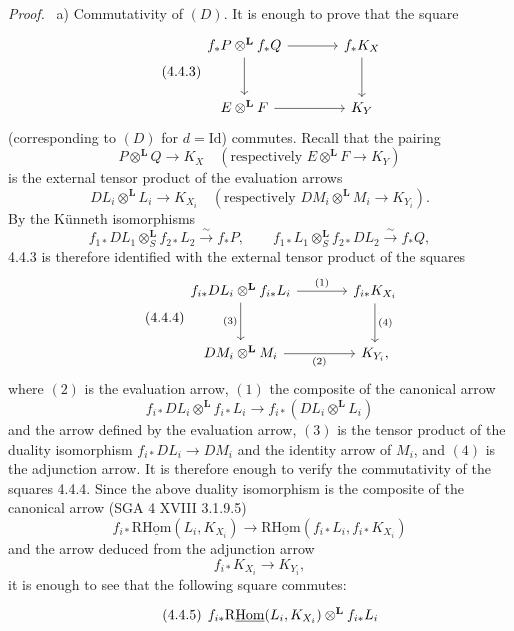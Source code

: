 \documentclass[11pt]{article}
\newenvironment{prooftext}[1][Proof]{\par\noindent\emph{#1.}\ }{\par\medskip}
\providecommand{\Id}{\mathrm{Id}}
\providecommand{\lisom}{\xrightarrow{\sim}}
\begin{document}
\begin{prooftext}[Proof]
a) Commutativity of $(D)$. It is enough to prove that the square
\begin{equation}
\tag{4.4.3}
\begin{tikzcd}[column sep=large,row sep=large]
f_*P\otimes^{\mathbf L}f_*Q \arrow[r] \arrow[d] & f_*K_X \arrow[d]\\
E\otimes^{\mathbf L}F \arrow[r] & K_Y
\end{tikzcd}
\end{equation}
(corresponding to $(D)$ for $d=\Id$) commutes. Recall that the pairing
\[
P\otimes^{\mathbf L}Q\longrightarrow K_X
\quad(\text{respectively }E\otimes^{\mathbf L}F\longrightarrow K_Y)
\]
is the external tensor product of the evaluation arrows
\[
DL_i\otimes^{\mathbf L}L_i\longrightarrow K_{X_i}
\quad(\text{respectively }DM_i\otimes^{\mathbf L}M_i\longrightarrow K_{Y_i}).
\]
By the Künneth isomorphisms
\[
f_{1*}DL_1\otimes_S^{\mathbf L} f_{2*}L_2 \lisom f_*P,\qquad
f_{1*}L_1\otimes_S^{\mathbf L} f_{2*}DL_2 \lisom f_*Q,
\]
4.4.3 is therefore identified with the external tensor product of the squares
\begin{equation}
\tag{4.4.4}
\begin{tikzcd}[column sep=large,row sep=large]
f_{i*}DL_i\otimes^{\mathbf L} f_{i*}L_i
 \arrow[r,"(1)"] \arrow[d,"(3)"'] &
f_{i*}K_{X_i} \arrow[d,"(4)"]\\
DM_i\otimes^{\mathbf L}M_i \arrow[r,"(2)"'] & K_{Y_i},
\end{tikzcd}
\end{equation}
where $(2)$ is the evaluation arrow, $(1)$ the composite of the canonical arrow
\[
f_{i*}DL_i\otimes^{\mathbf L} f_{i*}L_i\longrightarrow f_{i*}(DL_i\otimes^{\mathbf L}L_i)
\]
and the arrow defined by the evaluation arrow, $(3)$ is the tensor product of the duality isomorphism $f_{i*}DL_i\longrightarrow DM_i$ and the identity arrow of $M_i$, and $(4)$ is the adjunction arrow. It is therefore enough to verify the commutativity of the squares 4.4.4. Since the above duality isomorphism is the composite of the canonical arrow (SGA 4 XVIII 3.1.9.5)
\[
f_{i*}\mathrm{R}\underline{\mathrm{Hom}}(L_i,K_{X_i})\longrightarrow \mathrm{R}\underline{\mathrm{Hom}}(f_{i*}L_i,f_{i*}K_{X_i})
\]
and the arrow deduced from the adjunction arrow
\[
f_{i*}K_{X_i}\longrightarrow K_{Y_i},
\]
it is enough to see that the following square commutes:
\begin{equation}
\tag{4.4.5}
\begin{tikzcd}[column sep=large,row sep=large]
f_{i*}\mathrm{R}\underline{\mathrm{Hom}}(L_i,K_{X_i})\otimes^{\mathbf L} f_{i*}L_i

\end{tikzcd}
\end{equation}
\end{prooftext}
\end{document}

